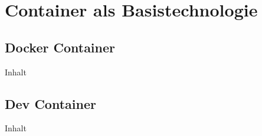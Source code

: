 \section{Container als Basistechnologie}
\label{sec:05-01_containers-as-base-technology}

\subsection{Docker Container}
\label{subsec:05-01-01_docker-container}

Inhalt

\subsection{Dev Container}
\label{subsec:05-01-02_dev-container}

Inhalt
